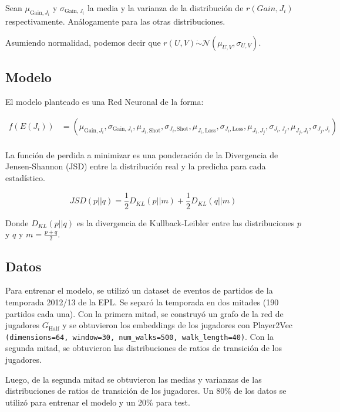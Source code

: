 \documentclass[
  a4paper,
]{article}
\begin{document}
Sean \(\mu_{\text{Gain}, J_i}\) y \(\sigma_{\text{Gain}, J_i}\) la media
y la varianza de la distribución de \(r(Gain, J_i)\) respectivamente.
Análogamente para las otras distribuciones.

Asumiendo normalidad, podemos decir que
\(r(U, V) \dot{\sim} \mathcal{N}(\mu_{U, V}, \sigma_{U, V})\).

\hypertarget{modelo}{%
\subsection{Modelo}\label{modelo}}

El modelo planteado es una Red Neuronal de la forma:

\[
\begin{aligned}
    f(E(J_i)) &= (\mu_{\text{Gain}, J_i}, \sigma_{\text{Gain}, J_i}, \mu_{J_i, \text{Shot}}, \sigma_{J_i, \text{Shot}}, \mu_{J_i, \text{Loss}}, \sigma_{J_i, \text{Loss}}, \mu_{J_i, J_j}, \sigma_{J_i, J_j}, \mu_{J_j, J_i}, \sigma_{J_j, J_i}) \\
\end{aligned}
\]

La función de perdida a minimizar es una ponderación de la Divergencia
de Jensen-Shannon (JSD) entre la distribución real y la predicha para
cada estadístico.

\[
JSD(p || q) = \frac{1}{2} D_{KL}(p||m) + \frac{1}{2} D_{KL}(q||m)
\]

Donde \(D_{KL}(p||q)\) es la divergencia de Kullback-Leibler entre las
distribuciones \(p\) y \(q\) y \(m = \frac{p + q}{2}\).

\hypertarget{datos}{%
\subsection{Datos}\label{datos}}

Para entrenar el modelo, se utilizó un dataset de eventos de partidos de
la temporada 2012/13 de la EPL. Se separó la temporada en dos mitades
(190 partidos cada una). Con la primera mitad, se construyó un grafo de
la red de jugadores \(G_{\text{Half}}\) y se obtuvieron los embeddings
de los jugadores con Player2Vec
\texttt{(dimensions=64,\ window=30,\ num\_walks=500,\ walk\_length=40)}.
Con la segunda mitad, se obtuvieron las distribuciones de ratios de
transición de los jugadores.

Luego, de la segunda mitad se obtuvieron las medias y varianzas de las
distribuciones de ratios de transición de los jugadores. Un 80\% de los
datos se utilizó para entrenar el modelo y un 20\% para test.
\end{document}
